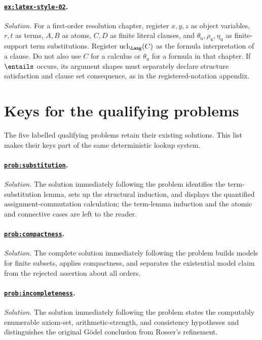 \paragraph{\hyperref[ex:latex-style-02]{\texttt{ex:latex-style-02}}.}
\textit{Solution.}  For a first-order resolution chapter, register
\(x,y,z\) as object variables, \(r,t\) as terms,
\(A,B\) as atoms, \(C,D\) as finite literal clauses, and
\(\theta_{\mathrm u},\rho_{\mathrm u},\eta_{\mathrm u}\) as finite-support
term substitutions.  Register \(\operatorname{ucl}_{\Lang}(C)\) as the formula
interpretation of a clause.  Do not also use \(C\) for a calculus or
\(\theta_{\mathrm u}\) for a formula in that chapter.  If \(\entails\) occurs,
its argument shapes must separately declare structure satisfaction and clause
set consequence, as in the registered-notation appendix.

\section{Keys for the qualifying problems}

The five labelled qualifying problems retain their existing solutions.  This
list makes their keys part of the same deterministic lookup system.

\paragraph{\hyperref[prob:substitution]{\texttt{prob:substitution}}.}
\textit{Solution.}  The solution immediately following the problem
identifies the term-substitution lemma, sets up the structural induction,
and displays the quantified assignment-commutation calculation; the
term-lemma induction and the atomic and connective cases are left to the
reader.

\paragraph{\hyperref[prob:compactness]{\texttt{prob:compactness}}.}
\textit{Solution.}  The complete solution immediately following the problem
builds models for finite subsets, applies compactness, and separates the
existential model claim from the rejected assertion about all orders.

\paragraph{\hyperref[prob:incompleteness]{\texttt{prob:incompleteness}}.}
\textit{Solution.}  The solution immediately following the problem states the
 computably enumerable axiom-set, arithmetic-strength, and consistency hypotheses and
distinguishes the original G\"odel conclusion from Rosser's refinement.


